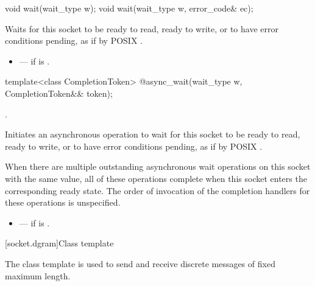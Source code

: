 \begin{itemdecl}
void wait(wait_type w);
void wait(wait_type w, error_code& ec);
\end{itemdecl}

\begin{itemdescr}
\pnum
\effects Waits for this socket to be ready to read, ready to write, or to have error conditions pending, as if by POSIX .

\pnum
\errors
\begin{itemize}
\item
{} --- if  is .
\end{itemize}
\end{itemdescr}

\begin{itemdecl}
template<class CompletionToken>
  @\DEDUCED@ async_wait(wait_type w, CompletionToken&& token);
\end{itemdecl}

\begin{itemdescr}
\pnum
\completionsig {}.

\pnum
\effects Initiates an asynchronous operation to wait for this socket to be ready to read, ready to write, or to have error conditions pending, as if by POSIX .

\pnum
When there are multiple outstanding asynchronous wait operations on this socket with the same  value, all of these operations complete when this socket enters the corresponding ready state. The order of invocation of the completion handlers for these operations is unspecified.

\pnum
\errors
\begin{itemize}
\item
{} --- if  is .
\end{itemize}
\end{itemdescr}




%
[socket.dgram]{Class template }

\pnum
The class template  is used to send and receive discrete messages of fixed maximum length.

